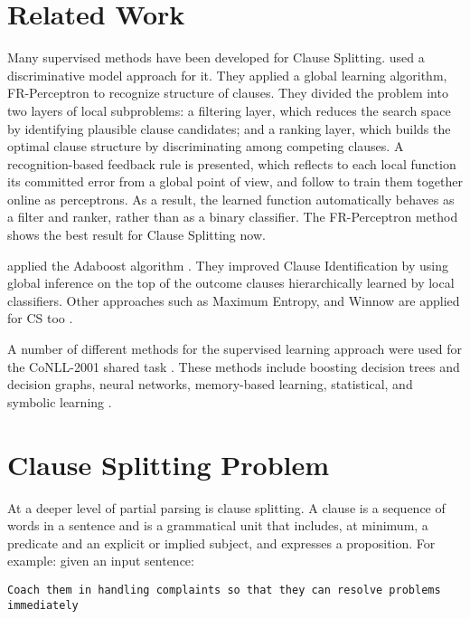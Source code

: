 \documentclass[english]{jnlp_1.4}
\begin{document}
\section{Related Work}

Many supervised methods have been developed for Clause Splitting.
\cite{Carreras2005} used a discriminative model approach for it.
They applied a global learning algorithm, FR-Perceptron
\cite{Collins2002} to recognize structure of clauses. They divided
the problem into two layers of local subproblems: a filtering layer,
which reduces the search space by identifying plausible clause
candidates; and a ranking layer, which builds the optimal clause
structure by discriminating among competing clauses. A
recognition-based feedback rule is presented, which reflects to each
local function its committed error from a global point of view, and
follow to train them together online as perceptrons. As a result,
the learned function automatically behaves as a filter and ranker,
rather than as a binary classifier. The FR-Perceptron method shows
the best result for Clause Splitting now.

\cite{Carreras2002} applied the Adaboost algorithm
\cite{Carreras2001}. They improved Clause Identification by using
global inference on the top of the outcome clauses hierarchically
learned by local classifiers. Other approaches such as Maximum
Entropy, and Winnow are applied for CS too \cite{Hachey2002}.

A number of different methods for the supervised learning approach
were used for the CoNLL-2001 shared task \cite{Sang2001}. These
methods include boosting decision trees and decision graphs,
neural networks, memory-based learning, statistical, and symbolic
learning \cite{Carreras2001,Hammerton2001,SangClause2001}.


\section{Clause Splitting Problem}
\label{sect:problem} 

At a deeper level of partial parsing is clause
splitting. A clause is a sequence of words in a sentence and is a
grammatical unit that includes, at minimum, a predicate and an
explicit or implied subject, and expresses a proposition. For
example: given an input sentence:

\texttt {Coach them in handling complaints so that they can
resolve problems
\linebreak 
immediately}
\end{document}
